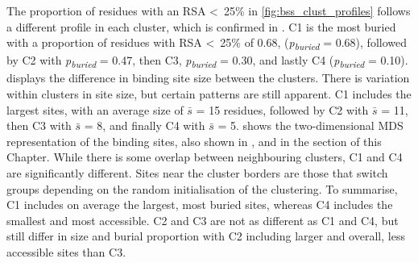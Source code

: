 {The proportion of residues with an RSA \textless~25\% in \autoref{fig:bss_clust_profiles} follows a different profile in each cluster, which is confirmed in . C1 is the most buried with a proportion of residues with RSA \textless~25\% of 0.68, (\textit{p\textsubscript{buried}} =  0.68), followed by C2 with \textit{p\textsubscript{buried}} = 0.47, then C3, \textit{p\textsubscript{buried}} = 0.30, and lastly C4 (\textit{p\textsubscript{buried}} = 0.10).  displays the difference in binding site size between the clusters. There is variation within clusters in site size, but certain patterns are still apparent. C1 includes the largest sites, with an average size of $\bar{\textit{s}}$ = 15 residues, followed by C2 with $\bar{\textit{s}}$ = 11, then C3 with $\bar{\textit{s}}$ = 8, and finally C4 with $\bar{\textit{s}}$ = 5.  shows the two-dimensional MDS representation of the binding sites, also shown in , and  in the  section of this Chapter. While there is some overlap between neighbouring clusters, C1 and C4 are significantly different. Sites near the cluster borders are those that switch groups depending on the random initialisation of the clustering. To summarise, C1 includes on average the largest, most buried sites, whereas C4 includes the smallest and most accessible. C2 and C3 are not as different as C1 and C4, but still differ in size and burial proportion with C2 including larger and overall, less accessible sites than C3.

}
